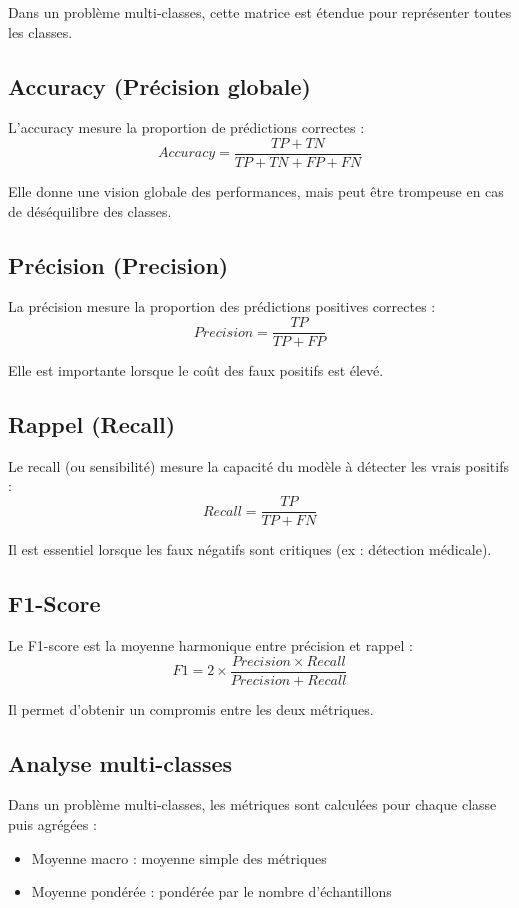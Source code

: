 \documentclass[12pt,a4paper]{article}
\begin{document}
    Dans un problème multi-classes, cette matrice est étendue pour représenter toutes les classes.

    \subsection{Accuracy (Précision globale)}

    L’accuracy mesure la proportion de prédictions correctes :
    \[
    Accuracy = \frac{TP + TN}{TP + TN + FP + FN}
    \]

    Elle donne une vision globale des performances, mais peut être trompeuse en cas de déséquilibre des classes.

    \subsection{Précision (Precision)}

    La précision mesure la proportion des prédictions positives correctes :
    \[
    Precision = \frac{TP}{TP + FP}
    \]

    Elle est importante lorsque le coût des faux positifs est élevé.

    \subsection{Rappel (Recall)}

    Le recall (ou sensibilité) mesure la capacité du modèle à détecter les vrais positifs :
    \[
    Recall = \frac{TP}{TP + FN}
    \]

    Il est essentiel lorsque les faux négatifs sont critiques (ex : détection médicale).

    \subsection{F1-Score}

    Le F1-score est la moyenne harmonique entre précision et rappel :
    \[
    F1 = 2 \times \frac{Precision \times Recall}{Precision + Recall}
    \]

    Il permet d’obtenir un compromis entre les deux métriques.

    \subsection{Analyse multi-classes}

    Dans un problème multi-classes, les métriques sont calculées pour chaque classe puis agrégées :
    \begin{itemize}
        \item Moyenne macro : moyenne simple des métriques
        \item Moyenne pondérée : pondérée par le nombre d’échantillons
    \end{itemize}
\end{document}
